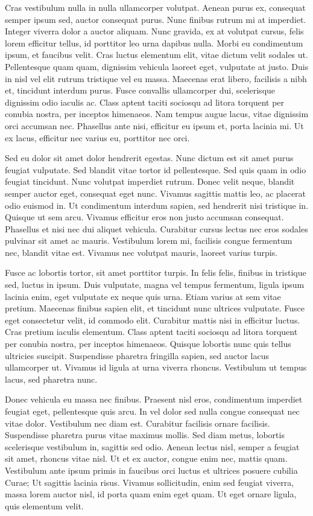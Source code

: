 \documentclass[12pt]{article}
\begin{document}
Cras vestibulum nulla in nulla ullamcorper volutpat. Aenean purus ex, consequat semper ipsum sed, auctor consequat purus. Nunc finibus rutrum mi at imperdiet. Integer viverra dolor a auctor aliquam. Nunc gravida, ex at volutpat cursus, felis lorem efficitur tellus, id porttitor leo urna dapibus nulla. Morbi eu condimentum ipsum, et faucibus velit. Cras luctus elementum elit, vitae dictum velit sodales ut. Pellentesque quam quam, dignissim vehicula laoreet eget, vulputate at justo. Duis in nisl vel elit rutrum tristique vel eu massa. Maecenas erat libero, facilisis a nibh et, tincidunt interdum purus. Fusce convallis ullamcorper dui, scelerisque dignissim odio iaculis ac. Class aptent taciti sociosqu ad litora torquent per conubia nostra, per inceptos himenaeos. Nam tempus augue lacus, vitae dignissim orci accumsan nec. Phasellus ante nisi, efficitur eu ipsum et, porta lacinia mi. Ut ex lacus, efficitur nec varius eu, porttitor nec orci.

Sed eu dolor sit amet dolor hendrerit egestas. Nunc dictum est sit amet purus feugiat vulputate. Sed blandit vitae tortor id pellentesque. Sed quis quam in odio feugiat tincidunt. Nunc volutpat imperdiet rutrum. Donec velit neque, blandit semper auctor eget, consequat eget nunc. Vivamus sagittis mattis leo, ac placerat odio euismod in. Ut condimentum interdum sapien, sed hendrerit nisi tristique in. Quisque ut sem arcu. Vivamus efficitur eros non justo accumsan consequat. Phasellus et nisi nec dui aliquet vehicula. Curabitur cursus lectus nec eros sodales pulvinar sit amet ac mauris. Vestibulum lorem mi, facilisis congue fermentum nec, blandit vitae est. Vivamus nec volutpat mauris, laoreet varius turpis.

Fusce ac lobortis tortor, sit amet porttitor turpis. In felis felis, finibus in tristique sed, luctus in ipsum. Duis vulputate, magna vel tempus fermentum, ligula ipsum lacinia enim, eget vulputate ex neque quis urna. Etiam varius at sem vitae pretium. Maecenas finibus sapien elit, et tincidunt nunc ultrices vulputate. Fusce eget consectetur velit, id commodo elit. Curabitur mattis nisi in efficitur luctus. Cras pretium iaculis elementum. Class aptent taciti sociosqu ad litora torquent per conubia nostra, per inceptos himenaeos. Quisque lobortis nunc quis tellus ultricies suscipit. Suspendisse pharetra fringilla sapien, sed auctor lacus ullamcorper ut. Vivamus id ligula at urna viverra rhoncus. Vestibulum ut tempus lacus, sed pharetra nunc.

Donec vehicula eu massa nec finibus. Praesent nisl eros, condimentum imperdiet feugiat eget, pellentesque quis arcu. In vel dolor sed nulla congue consequat nec vitae dolor. Vestibulum nec diam est. Curabitur facilisis ornare facilisis. Suspendisse pharetra purus vitae maximus mollis. Sed diam metus, lobortis scelerisque vestibulum in, sagittis sed odio. Aenean lectus nisl, semper a feugiat sit amet, rhoncus vitae nisl. Ut et ex auctor, congue enim nec, mattis quam. Vestibulum ante ipsum primis in faucibus orci luctus et ultrices posuere cubilia Curae; Ut sagittis lacinia risus. Vivamus sollicitudin, enim sed feugiat viverra, massa lorem auctor nisl, id porta quam enim eget quam. Ut eget ornare ligula, quis elementum velit.
\end{document}
